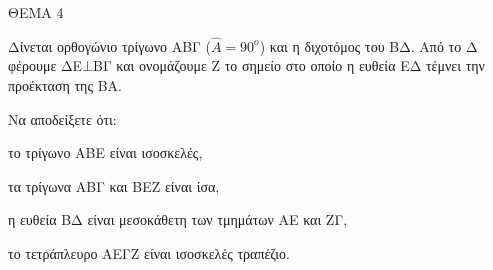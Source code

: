 
ΘΕΜΑ 4

Δίνεται ορθογώνιο τρίγωνο ΑΒΓ ($\widehat{Α} = 90^{ο}$) και η διχοτόμος του ΒΔ. Από το Δ φέρουμε ΔΕ$\bot$ΒΓ και ονομάζουμε Ζ το σημείο στο οποίο η ευθεία ΕΔ τέμνει την προέκταση της ΒΑ.

Να αποδείξετε ότι:

\begin{alist}
\item το τρίγωνο ΑΒΕ είναι ισοσκελές, 

\item τα τρίγωνα ΑΒΓ και ΒΕΖ είναι ίσα, 

\item η ευθεία ΒΔ είναι μεσοκάθετη των τμημάτων ΑΕ και ΖΓ, 

\item το τετράπλευρο ΑΕΓΖ είναι ισοσκελές τραπέζιο. 
\end{alist}
